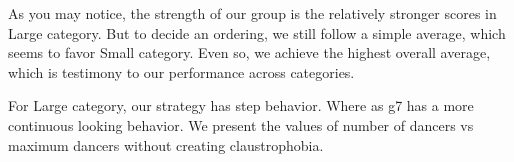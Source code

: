 As you may notice, the strength of our group is the relatively stronger
scores in Large category. But to decide an ordering, we still follow a
simple average, which seems to favor Small category. Even so, we achieve
the highest overall average, which is testimony to our performance
across categories.

For Large category, our strategy has step behavior. Where as g7 has a
more continuous looking behavior. We present the values of number of
dancers vs maximum dancers without creating claustrophobia.
